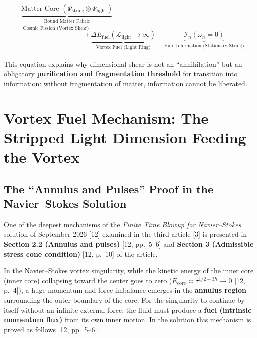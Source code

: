 \documentclass[12pt,a4paper]{article}
\begin{document}
\begin{equation}
\begin{aligned}
&\underbrace{\text{Matter Core } (\Psi_{\text{string}} \otimes \Psi_{\text{light}})}_{\text{Bound Matter Fabric}} \\
&\xrightarrow{\text{Cosmic Fission (Vortex Shear)}} \underbrace{\Delta E_{\text{fuel}}(\mathcal{L}_{\text{light}} \to \infty)}_{\text{Vortex Fuel (Light Ring)}} + \underbrace{\mathcal{I}_n (\omega_n = 0)}_{\text{Pure Information (Stationary String)}}
\end{aligned}
\end{equation}

This equation explains why dimensional shear is not an ``annihilation'' but an obligatory \textbf{purification and fragmentation threshold} for transition into information: without fragmentation of matter, information cannot be liberated.

\section{Vortex Fuel Mechanism: The Stripped Light Dimension Feeding the Vortex}

\subsection{The ``Annulus and Pulses'' Proof in the Navier--Stokes Solution}

One of the deepest mechanisms of the \textit{Finite Time Blowup for Navier--Stokes} solution of September 2026 [12] examined in the third article [3] is presented in \textbf{Section 2.2 (Annulus and pulses)} [12, pp.\ 5--6] and \textbf{Section 3 (Admissible stress cone condition)} [12, p.\ 10] of the article.

In the Navier--Stokes vortex singularity, while the kinetic energy of the inner core (inner core) collapsing toward the center goes to zero ($E_{\text{core}} \asymp \tau^{1/2-3h} \to 0$ [12, p.\ 4]), a huge momentum and force imbalance emerges in the \textbf{annulus region} surrounding the outer boundary of the core. For the singularity to continue by itself without an infinite external force, the fluid must produce a \textbf{fuel (intrinsic momentum flux)} from its own inner motion. In the solution this mechanism is proved as follows [12, pp.\ 5--6]:
\end{document}
